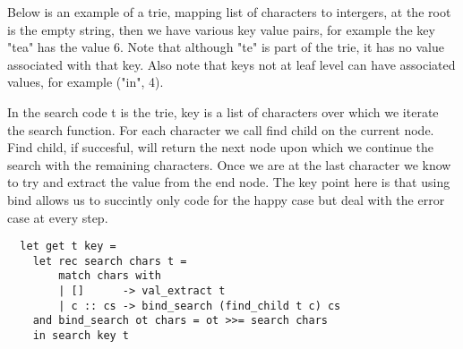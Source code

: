 Below is an example of a trie,
mapping list of characters to intergers,
at the root is the empty string,
then we have various key value pairs,
for example the key "tea" has the value 6.
Note that although "te" is part of the trie,
it has no value associated with that key.
Also note that keys not at leaf level can have associated
values, for example ("in", 4).
\begin{center}
\end{center}

In the search code t is the trie, key is a list of characters over which
we iterate the search function. For each character we call find child on
the current node. Find child, if succesful, will return the next node
upon which we continue the search with the remaining characters. Once we
are at the last character we know to try and extract the value from the end
node. The key point here is that using bind allows us to succintly only code
for the happy case but deal with the error case at every step.

\begin{verbatim}
  let get t key =
    let rec search chars t =
        match chars with
        | []      -> val_extract t
        | c :: cs -> bind_search (find_child t c) cs
    and bind_search ot chars = ot >>= search chars
    in search key t
\end{verbatim}

